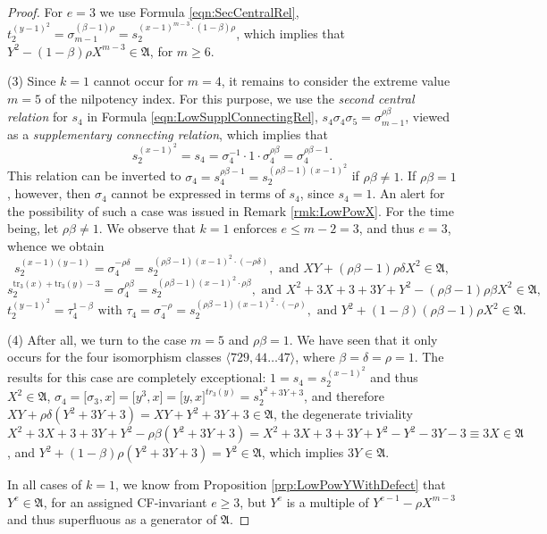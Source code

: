 \documentclass{amsart}
\theoremstyle{definition}
\numberwithin{equation}{section}
\begin{document}
\begin{proof}
For \(e=3\) we use Formula
\eqref{eqn:SecCentralRel},
\(t_2^{(y-1)^2}=\sigma_{m-1}^{(\beta-1)\rho}=s_2^{(x-1)^{m-3}\cdot (1-\beta)\rho}\),
which implies that \(Y^2-(1-\beta)\rho X^{m-3}\in\mathfrak{A}\), for \(m\ge 6\).

\noindent
(3)
Since \(k=1\) cannot occur for \(m=4\),
it remains to consider the extreme value \(m=5\) of the nilpotency index.
For this purpose, we use the \textit{second central relation} for \(s_4\) in Formula
\eqref{eqn:LowSupplConnectingRel},
\(s_4\sigma_4\sigma_5=\sigma_{m-1}^{\rho\beta}\),
viewed as a \textit{supplementary connecting relation},
which implies that
\[s_2^{(x-1)^2}=s_4=\sigma_4^{-1}\cdot 1\cdot\sigma_{4}^{\rho\beta}=\sigma_4^{\rho\beta-1}.\]
This relation can be inverted to \(\sigma_4=s_4^{\rho\beta-1}=s_2^{(\rho\beta-1)(x-1)^2}\) if \(\rho\beta\ne 1\).
If \(\rho\beta=1\), however, then \(\sigma_4\) cannot be expressed in terms of \(s_4\), since \(s_4=1\).
An alert for the possibility of such a case was issued in Remark
\ref{rmk:LowPowX}.
For the time being, let \(\rho\beta\ne 1\).
We observe that \(k=1\) enforces \(e\le m-2=3\), and thus \(e=3\),
whence we obtain
\[s_2^{(x-1)(y-1)}=\sigma_{4}^{-\rho\delta}=s_2^{(\rho\beta-1)(x-1)^2\cdot (-\rho\delta)},
\text{ and } XY+(\rho\beta-1)\rho\delta X^2\in\mathfrak{A},\]
\[s_2^{\mathrm{tr}_3(x)+\mathrm{tr}_3(y)-3}=\sigma_{4}^{\rho\beta}=s_2^{(\rho\beta-1)(x-1)^2\cdot\rho\beta},
\text{ and } X^2+3X+3+3Y+Y^2-(\rho\beta-1)\rho\beta X^2\in\mathfrak{A},\]
\[t_2^{(y-1)^2}=\tau_{4}^{1-\beta} \text{ with } \tau_{4}=\sigma_{4}^{-\rho}=s_2^{(\rho\beta-1)(x-1)^2\cdot (-\rho)},
\text{ and } Y^2+(1-\beta)(\rho\beta-1)\rho X^2\in\mathfrak{A}.\]

\noindent
(4)
After all, we turn to the case \(m=5\) and \(\rho\beta=1\).
We have seen that it only occurs for the four isomorphism classes \(\langle 729,44\ldots 47\rangle\),
where \(\beta=\delta=\rho=1\).
The results for this case are completely exceptional:
\(1=s_4=s_2^{(x-1)^2}\) and thus \(X^2\in\mathfrak{A}\),
\(\sigma_4=\lbrack\sigma_3,x\rbrack=\lbrack y^3,x\rbrack=\lbrack y,x\rbrack^{tr_3(y)}=s_2^{Y^2+3Y+3}\),
and therefore
\(XY+\rho\delta(Y^2+3Y+3)=XY+Y^2+3Y+3\in\mathfrak{A}\),
the degenerate triviality
\(X^2+3X+3+3Y+Y^2-\rho\beta(Y^2+3Y+3)=X^2+3X+3+3Y+Y^2-Y^2-3Y-3\equiv 3X\in\mathfrak{A}\),
and \(Y^2+(1-\beta)\rho(Y^2+3Y+3)=Y^2\in\mathfrak{A}\), which implies \(3Y\in\mathfrak{A}\).

In all cases of \(k=1\), we know from Proposition
\ref{prp:LowPowYWithDefect}
that \(Y^{e}\in\mathfrak{A}\), for an assigned CF-invariant \(e\ge 3\),
but \(Y^{e}\) is a multiple of \(Y^{e-1}-\rho X^{m-3}\) and thus superfluous as a generator of \(\mathfrak{A}\).
\end{proof}
\end{document}
